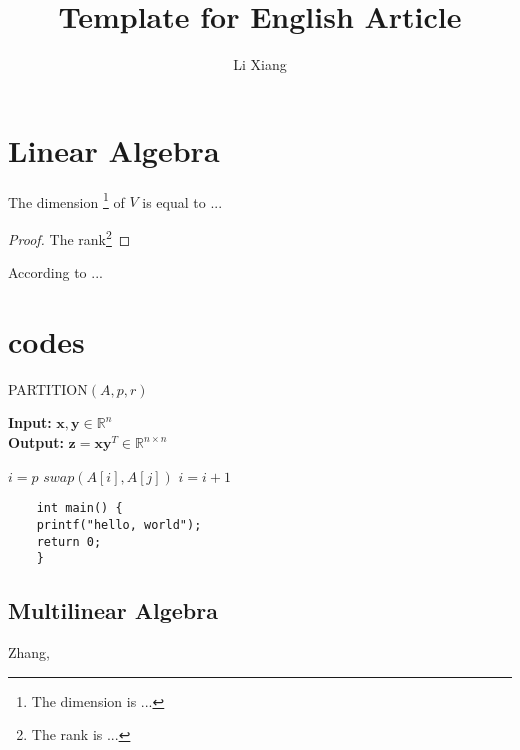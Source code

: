 \documentclass{article}
\title{\textbf{Template for English Article}}
\author{Li Xiang}
\date{}
\newtheorem{theorem}{Theorem}[section]
\begin{document}
\maketitle

\tableofcontents
\newpage

\setcounter{page}{1}

\section{Linear Algebra}

\begin{tcolorbox}
[colframe=cyan!40!black,
title={\begin{theorem}
[Rank-Nullity]\end{theorem}}]
The dimension 
\footnote{The dimension is ...}
of $V$ is equal to ...
\end{tcolorbox}

\begin{proof}
    The rank\footnote{The rank is ...}
\end{proof}
According to ...\cite{ref1}

\newpage

\section{codes}
\begin{algorithm}[!h]
	\caption{PARTITION$(A,p,r)$}%
	\textbf{Input: }{$\mathbf{x},
    \mathbf{y}\in\mathbb{R}^n$}\\
    \textbf{Output:}
    {$\mathbf{z}=\mathbf{x}
    \mathbf{y}^T\in\mathbb{R}^{n\times n}$}
    \begin{algorithmic}[1]%
		\STATE $i=p$
		\STATE $swap(A[i],A[j])$
		\STATE $i=i+1$
		\ENDIF
		\ENDFOR
    \end{algorithmic}
\end{algorithm}

\begin{verbatim}
    int main() {
    printf("hello, world");
    return 0;
    }
\end{verbatim}

\newpage

\begin{appendices}
\section{Multilinear Algebra}
\end{appendices}
\newpage

\begin{thebibliography}{99}
Zhang,
\end{thebibliography}
\end{document}
